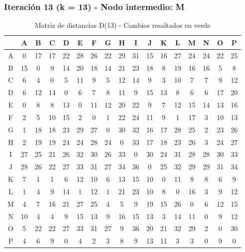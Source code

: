 \documentclass[12pt]{article}
\begin{document}
\subsubsection{Iteración 13 (k = 13) - Nodo intermedio: M}
\begin{table}[h!]
\centering
\begin{tabular}{|c|c|c|c|c|c|c|c|c|c|c|c|c|c|c|c|c|}
\hline
 & A & B & C & D & E & F & G & H & I & J & K & L & M & N & O & P \\\hline
A & 0 & 17 & 17 & 22 & 28 & 26 & 22 & \cellcolor{lightgreen} 29 & 31 & 15 & 16 & 27 & 24 & 24 & 22 & 25 \\\hline
B & 15 & 0 & 9 & 14 & 20 & 18 & 14 & \cellcolor{lightgreen} 21 & 23 & 18 & 8 & 19 & 16 & 16 & 5 & 8 \\\hline
C & 6 & 4 & 0 & 5 & 11 & 9 & 5 & \cellcolor{lightgreen} 12 & 14 & 9 & 3 & 10 & 7 & 7 & 9 & 12 \\\hline
D & 6 & 12 & 14 & 0 & 6 & 7 & 8 & \cellcolor{lightgreen} 11 & 9 & 15 & 13 & 8 & 6 & 6 & 17 & 20 \\\hline
E & 0 & 8 & 8 & 13 & 0 & 11 & 12 & \cellcolor{lightgreen} 20 & 22 & 9 & 7 & 12 & 15 & 14 & 13 & 16 \\\hline
F & 2 & 5 & 10 & 15 & 2 & 0 & 1 & \cellcolor{lightgreen} 22 & 24 & 11 & 9 & 1 & 17 & 3 & 10 & 13 \\\hline
G & 1 & 18 & 18 & 23 & 29 & 27 & 0 & \cellcolor{lightgreen} 30 & 32 & 16 & 17 & 28 & 25 & 2 & 23 & 26 \\\hline
H & 2 & 19 & 19 & 24 & 24 & 28 & 24 & 0 & 33 & 17 & 18 & 23 & 26 & 3 & 24 & 27 \\\hline
I & 27 & 25 & 21 & 26 & 32 & 30 & 26 & \cellcolor{lightgreen} 33 & 0 & 30 & 24 & 31 & 28 & 28 & 30 & 33 \\\hline
J & 28 & 26 & 22 & 27 & 33 & 31 & 27 & \cellcolor{lightgreen} 34 & 36 & 0 & 25 & 32 & 29 & 29 & 31 & 34 \\\hline
K & 7 & 1 & 1 & 6 & 12 & 10 & 6 & \cellcolor{lightgreen} 13 & 15 & 10 & 0 & 11 & 8 & 8 & 6 & 9 \\\hline
L & 1 & 4 & 9 & 14 & 1 & 12 & 1 & \cellcolor{lightgreen} 21 & 23 & 10 & 8 & 0 & 16 & 3 & 9 & 12 \\\hline
M & 4 & 7 & 16 & 21 & 27 & 25 & 4 & 5 & 9 & 19 & 15 & 26 & 0 & 6 & 12 & 15 \\\hline
N & 10 & 4 & 4 & 9 & 15 & 13 & 9 & \cellcolor{lightgreen} 16 & 15 & 13 & 3 & 14 & 11 & 0 & 9 & 12 \\\hline
O & 5 & 22 & 22 & 27 & 33 & 31 & 27 & 9 & 36 & 20 & 21 & 32 & 29 & 2 & 0 & 30 \\\hline
P & 4 & 6 & 9 & 0 & 4 & 2 & 3 & \cellcolor{lightgreen} 8 & 9 & 13 & 11 & 3 & 3 & 0 & 9 & 0 \\\hline
\end{tabular}
\caption{Matriz de distancias D(13) - Cambios resaltados en verde}
\end{table}
\end{document}
